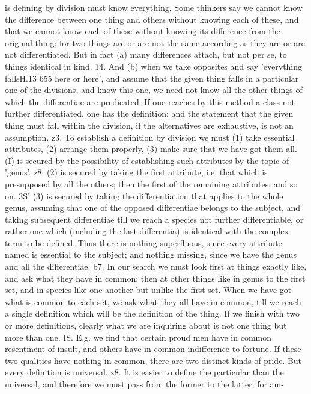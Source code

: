 {{{{{{{{{{{{{{{{{{{{{{{{{{{{{{{{{{{{{{{{{{{{{{{{{{{{{{{{{{{{{{{is defining by division must know everything. Some thinkers
say we cannot know the difference between one thing and others
without knowing each of these, and that we cannot know each
of these without knowing its difference from the original thing;
for two things are or are not the same according as they are or
are not differentiated. But in fact (a) many differences attach,
but not per se, to things identical in kind.
14. And (b) when we take opposites and say 'everything fallsH.13
655
here or here', and assume that the given thing falls in a particular
one of the divisions, and know this one, we need not know all the
other things of which the differentiae are predicated. If one
reaches by this method a class not further differentiated, one has
the definition; and the statement that the given thing must fall
within the division, if the alternatives are exhaustive, is not an
assumption.
z3. To establish a definition by division we must (1) take
essential attributes, (2) arrange them properly, (3) make sure
that we have got them all. (I) is secured by the possibility of
establishing such attributes by the topic of 'genus'.
z8. (2) is secured by taking the first attribute, i.e. that which
is presupposed by all the others; then the first of the remaining
attributes; and so on.
3S' (3) is secured by taking the differentiation that applies to
the whole genus, assuming that one of the opposed differentiae
belongs to the subject, and taking subsequent differentiae till
we reach a species not further differentiable, or rather one which
(including the last differentia) is identical with the complex term
to be defined. Thus there is nothing superfluous, since every
attribute named is essential to the subject; and nothing missing,
since we have the genus and all the differentiae.
b7. In our search we must look first at things exactly like, and
ask what they have in common; then at other things like in
genus to the first set, and in species like one another but unlike
the first set. When we have got what is common to each set, we
ask what they all have in common, till we reach a single definition
which will be the definition of the thing. If we finish with two
or more definitions, clearly what we are inquiring about is not
one thing but more than one.
IS. E.g. we find that certain proud men have in common
resentment of insult, and others have in common indifference to
fortune. If these two qualities have nothing in common, there
are two distinct kinds of pride. But every definition is universal.
z8. It is easier to define the particular than the universal, and
therefore we must pass from the former to the latter; for am-
}}}}}}}}}}}}}}}}}}}}}}}}}}}}}}}}}}}}}}}}}}}}}}}}}}}}}}}}}}}}}}}

